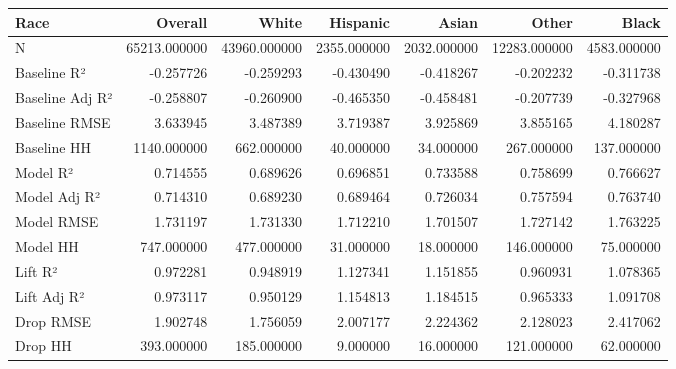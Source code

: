 \begin{tabular}{lrrrrrr}
\toprule
Race &       Overall &         White &     Hispanic &        Asian &         Other &        Black \\
\midrule
N               &  65213.000000 &  43960.000000 &  2355.000000 &  2032.000000 &  12283.000000 &  4583.000000 \\
Baseline R²     &     -0.257726 &     -0.259293 &    -0.430490 &    -0.418267 &     -0.202232 &    -0.311738 \\
Baseline Adj R² &     -0.258807 &     -0.260900 &    -0.465350 &    -0.458481 &     -0.207739 &    -0.327968 \\
Baseline RMSE   &      3.633945 &      3.487389 &     3.719387 &     3.925869 &      3.855165 &     4.180287 \\
Baseline HH     &   1140.000000 &    662.000000 &    40.000000 &    34.000000 &    267.000000 &   137.000000 \\
Model R²        &      0.714555 &      0.689626 &     0.696851 &     0.733588 &      0.758699 &     0.766627 \\
Model Adj R²    &      0.714310 &      0.689230 &     0.689464 &     0.726034 &      0.757594 &     0.763740 \\
Model RMSE      &      1.731197 &      1.731330 &     1.712210 &     1.701507 &      1.727142 &     1.763225 \\
Model HH        &    747.000000 &    477.000000 &    31.000000 &    18.000000 &    146.000000 &    75.000000 \\
Lift R²         &      0.972281 &      0.948919 &     1.127341 &     1.151855 &      0.960931 &     1.078365 \\
Lift Adj R²     &      0.973117 &      0.950129 &     1.154813 &     1.184515 &      0.965333 &     1.091708 \\
Drop RMSE       &      1.902748 &      1.756059 &     2.007177 &     2.224362 &      2.128023 &     2.417062 \\
Drop HH         &    393.000000 &    185.000000 &     9.000000 &    16.000000 &    121.000000 &    62.000000 \\
\bottomrule
\end{tabular}
